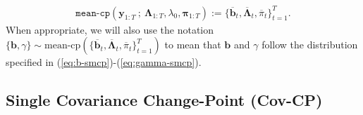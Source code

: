 \begin{align}\label{eq:smcp}
    \texttt{mean-cp}\left(\mathbf{y}_{1:T} \:;\: \boldsymbol{\Lambda}_{1:T}, \lambda_0, \boldsymbol{\pi}_{1:T}\right) := \{\overline{\mathbf{b}}_t, \overline{\boldsymbol{\Lambda}}_t, \overline{\pi}_t\}_{t=1}^T.
\end{align}
When appropriate, we will also use the notation $\{\mathbf{b},\gamma\} \sim \text{mean-cp}(\{\overline{\mathbf{b}}_t, \overline{\boldsymbol{\Lambda}}_t, \overline{\pi}_t\}_{t=1}^T)$ to mean that $\mathbf{b}$ and $\gamma$ follow the distribution specified in (\ref{eq:b-smcp})-(\ref{eq:gamma-smcp}).

\subsection{Single Covariance Change-Point (Cov-CP)}
\label{sec:sscp}

